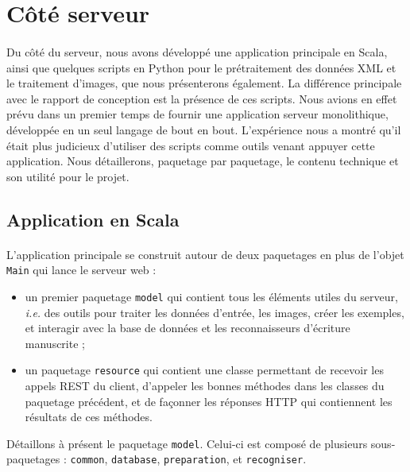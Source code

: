 \section{Côté serveur}

\paragraph{}
Du côté du serveur, nous avons développé une application principale en Scala, ainsi que quelques scripts en Python pour le prétraitement des données XML et le traitement d'images, que nous présenterons également. La différence principale avec le rapport de conception est la présence de ces scripts. Nous avions en effet prévu dans un premier temps de fournir une application serveur monolithique, développée en un seul langage de bout en bout. L'expérience nous a montré qu'il était plus judicieux d'utiliser des scripts comme outils venant appuyer cette application. 
Nous détaillerons, paquetage par paquetage, le contenu technique et son utilité pour le projet.

\subsection{Application en Scala}

\paragraph{}
L'application principale se construit autour de deux paquetages en plus de l'objet \texttt{Main} qui lance le serveur web :
\begin{itemize}
\item un premier paquetage \texttt{model} qui contient tous les éléments utiles du serveur, \textit{i.e.} des outils pour traiter les données d'entrée, les images, créer les exemples, et interagir avec la base de données et les reconnaisseurs d'écriture manuscrite ;
\item un paquetage \texttt{resource} qui contient une classe permettant de recevoir les appels REST du client, d'appeler les bonnes méthodes dans les classes du paquetage précédent, et de façonner les réponses HTTP qui contiennent les résultats de ces méthodes.
\end{itemize}
Détaillons à présent le paquetage \texttt{model}. Celui-ci est composé de plusieurs sous-paquetages : \texttt{common}, \texttt{database}, \texttt{preparation}, et \texttt{recogniser}.

